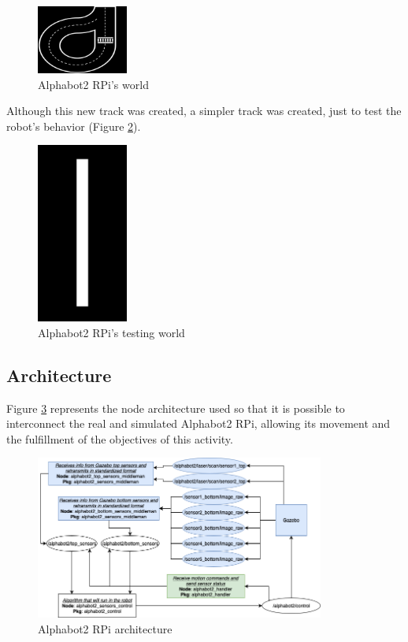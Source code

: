\documentclass[conference]{IEEEtran}
\begin{document}
\begin{figure}[H]
    \centering
    \includegraphics[width=3cm]{AB2-track.png}
    \caption{Alphabot2 RPi's world}
    \label{fig:fig7}
\end{figure}

Although this new track was created, a simpler track was created, just to test the robot's behavior (Figure \ref{fig:fig8}).

\begin{figure}[H]
    \centering
    \includegraphics[width=3cm]{AB2-track2.png}
    \caption{Alphabot2 RPi's testing world}
    \label{fig:fig8}
\end{figure}


\subsection{Architecture} \label{ros}

Figure \ref{fig:fig9} represents the node architecture used so that it is possible to interconnect the real and simulated Alphabot2 RPi, allowing its movement and the fulfillment of the objectives of this activity.

\begin{figure}[H]
    \centering
    \includegraphics[width=9.5cm]{arch.png}
    \caption{Alphabot2 RPi architecture}
    \label{fig:fig9}
\end{figure}
\end{document}
